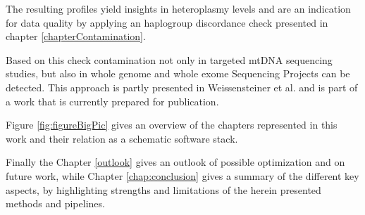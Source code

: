 The resulting profiles yield insights in heteroplasmy levels and are an indication for data quality by applying an haplogroup discordance check presented in chapter \ref{chapterContamination}.


Based on this check contamination not only in targeted mtDNA sequencing studies, but also in whole genome and whole exome Sequencing Projects can be detected. This approach is partly presented in Weissensteiner et al. \cite{Weissensteiner2016b} and is part of a work that is currently prepared for publication.


Figure \ref{fig:figureBigPic} gives an overview of the chapters represented in this work and their relation as a schematic software stack.

 
Finally the Chapter \ref{outlook} gives an outlook of possible optimization and on future work, while Chapter \ref{chap:conclusion} gives a summary of the different key aspects, by highlighting strengths and limitations of the herein presented methods and pipelines.




